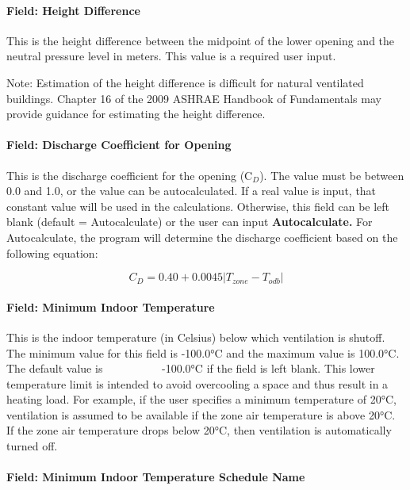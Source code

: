 \paragraph{Field: Height Difference}\label{field-height-difference}

This is the height difference between the midpoint of the lower opening and the neutral pressure level in meters. This value is a required user input.

Note: Estimation of the height difference is difficult for natural ventilated buildings. Chapter 16 of the 2009 ASHRAE Handbook of Fundamentals may provide guidance for estimating the height difference.

\paragraph{Field: Discharge Coefficient for Opening}\label{field-discharge-coefficient-for-opening}

This is the discharge coefficient for the opening (C\(_{D}\)). The value must be between 0.0 and 1.0, or the value can be autocalculated. If a real value is input, that constant value will be used in the calculations. Otherwise, this field can be left blank (default = Autocalculate) or the user can input \textbf{Autocalculate.} For Autocalculate, the program will determine the discharge coefficient based on the following equation:

\begin{equation}
{C_D} = 0.40 + 0.0045\left| {{T_{zone}} - {T_{odb}}} \right|
\end{equation}

\paragraph{Field: Minimum Indoor Temperature}\label{field-minimum-indoor-temperature-1}

This is the indoor temperature (in Celsius) below which ventilation is shutoff. The minimum value for this field is -100.0°C and the maximum value is 100.0°C. The default value is~~~~~~~~~~ -100.0°C if the field is left blank. This lower temperature limit is intended to avoid overcooling a space and thus result in a heating load. For example, if the user specifies a minimum temperature of 20°C, ventilation is assumed to be available if the zone air temperature is above 20°C. If the zone air temperature drops below 20°C, then ventilation is automatically turned off.

\paragraph{Field: Minimum Indoor Temperature Schedule Name}\label{field-minimum-indoor-temperature-schedule-name-1}

